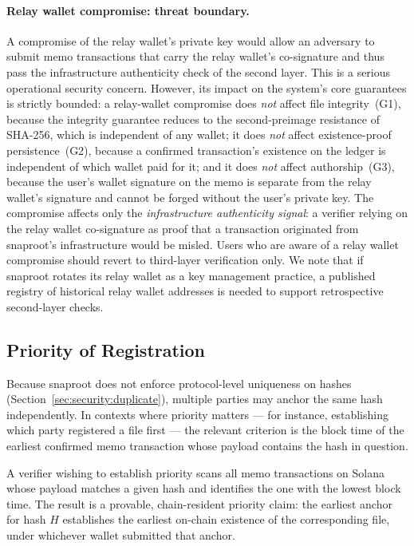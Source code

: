 \documentclass[11pt,a4paper]{article}
\begin{document}
\paragraph{Relay wallet compromise: threat boundary.}
A compromise of the relay wallet's private key would allow an
adversary to submit memo transactions that carry the relay wallet's
co-signature and thus pass the infrastructure authenticity check of
the second layer. This is a serious operational security concern.
However, its impact on the system's core guarantees is strictly
bounded: a relay-wallet compromise does \emph{not} affect file
integrity~(G1), because the integrity guarantee reduces to the
second-preimage resistance of SHA-256, which is independent of any
wallet; it does \emph{not} affect existence-proof
persistence~(G2), because a confirmed transaction's existence on the
ledger is independent of which wallet paid for it; and it does
\emph{not} affect authorship~(G3), because the user's wallet
signature on the memo is separate from the relay wallet's signature
and cannot be forged without the user's private key. The compromise
affects only the \emph{infrastructure authenticity signal}: a
verifier relying on the relay wallet co-signature as proof that a
transaction originated from snaproot's infrastructure would be
misled. Users who are aware of a relay wallet compromise should
revert to third-layer verification only. We note that if snaproot
rotates its relay wallet as a key management practice, a published
registry of historical relay wallet addresses is needed to support
retrospective second-layer checks.

\subsection{Priority of Registration}
\label{sec:security:priority}

Because snaproot does not enforce protocol-level uniqueness on hashes
(Section~\ref{sec:security:duplicate}), multiple parties may anchor
the same hash independently. In contexts where priority matters ---
for instance, establishing which party registered a file first --- the
relevant criterion is the block time of the earliest confirmed memo
transaction whose payload contains the hash in question.

A verifier wishing to establish priority scans all memo transactions
on Solana whose payload matches a given hash and identifies the one
with the lowest block time. The result is a provable, chain-resident
priority claim: the earliest anchor for hash $H$ establishes the
earliest on-chain existence of the corresponding file, under whichever
wallet submitted that anchor.
\end{document}
